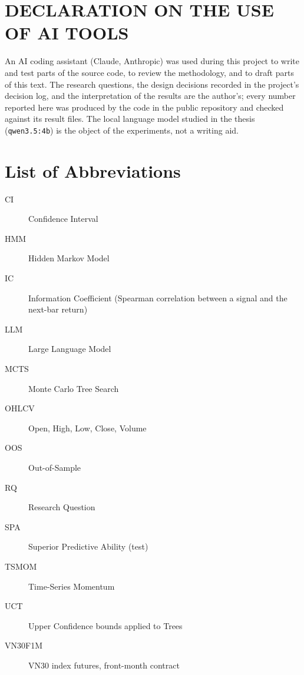 \documentclass[12pt,a4paper,oneside]{book}
\theoremstyle{definition}
\newcommand{\code}[1]{\texttt{#1}}
\newif\ifdsr
\begin{document}
\chapter*{DECLARATION ON THE USE OF AI TOOLS}

An AI coding assistant (Claude, Anthropic) was used during this project to write and test parts of the source code, to review the methodology, and to draft parts of this text. The research questions, the design decisions recorded in the project's decision log, and the interpretation of the results are the author's; every number reported here was produced by the code in the public repository and checked against its result files. The local language model studied in the thesis (\code{qwen3.5:4b}) is the object of the experiments, not a writing aid.

	\newpage
	\clearpage

	\mainmatter
	\tableofcontents
	\newpage
	\clearpage

\listoffigures
\newpage
\clearpage

\listoftables
\newpage
\clearpage

\chapter*{List of Abbreviations}
\begin{description}
    \item[CI] Confidence Interval
\ifdsr
    \item[DSR] Deflated Sharpe Ratio
\fi
    \item[HMM] Hidden Markov Model
    \item[IC] Information Coefficient (Spearman correlation between a signal and the next-bar return)
    \item[LLM] Large Language Model
    \item[MCTS] Monte Carlo Tree Search
    \item[OHLCV] Open, High, Low, Close, Volume
    \item[OOS] Out-of-Sample
\ifdsr
    \item[PSR] Probabilistic Sharpe Ratio
\fi
    \item[RQ] Research Question
    \item[SPA] Superior Predictive Ability (test)
    \item[TSMOM] Time-Series Momentum
    \item[UCT] Upper Confidence bounds applied to Trees
    \item[VN30F1M] VN30 index futures, front-month contract
\end{description}
\end{document}
